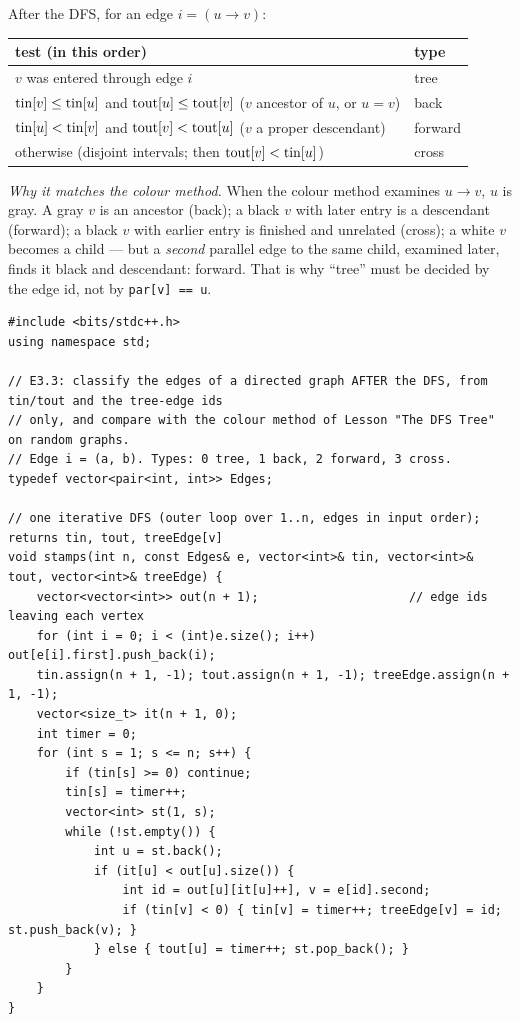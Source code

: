 \begin{solutionbox}
After the DFS, for an edge $i = (u \to v)$:
\begin{center}\small
\begin{tabular}{@{}ll@{}}
\toprule
\textbf{test (in this order)} & \textbf{type} \\
\midrule
$v$ was entered through edge $i$ & tree \\
$\mathrm{tin}[v] \le \mathrm{tin}[u]$ and $\mathrm{tout}[u] \le \mathrm{tout}[v]$ ($v$ ancestor of $u$, or $u = v$) & back \\
$\mathrm{tin}[u] < \mathrm{tin}[v]$ and $\mathrm{tout}[v] < \mathrm{tout}[u]$ ($v$ a proper descendant) & forward \\
otherwise (disjoint intervals; then $\mathrm{tout}[v] < \mathrm{tin}[u]$) & cross \\
\bottomrule
\end{tabular}
\end{center}
\emph{Why it matches the colour method.} When the colour method examines $u \to v$, $u$ is gray. A gray $v$ is an ancestor (back); a black $v$ with later entry is a descendant (forward); a black $v$ with earlier entry is finished and unrelated (cross); a white $v$ becomes a child --- but a \emph{second} parallel edge to the same child, examined later, finds it black and descendant: forward. That is why ``tree'' must be decided by the edge id, not by \texttt{par[v] == u}.
\begin{lstlisting}[style=cpp]
#include <bits/stdc++.h>
using namespace std;

// E3.3: classify the edges of a directed graph AFTER the DFS, from tin/tout and the tree-edge ids
// only, and compare with the colour method of Lesson "The DFS Tree" on random graphs.
// Edge i = (a, b). Types: 0 tree, 1 back, 2 forward, 3 cross.
typedef vector<pair<int, int>> Edges;

// one iterative DFS (outer loop over 1..n, edges in input order); returns tin, tout, treeEdge[v]
void stamps(int n, const Edges& e, vector<int>& tin, vector<int>& tout, vector<int>& treeEdge) {
    vector<vector<int>> out(n + 1);                     // edge ids leaving each vertex
    for (int i = 0; i < (int)e.size(); i++) out[e[i].first].push_back(i);
    tin.assign(n + 1, -1); tout.assign(n + 1, -1); treeEdge.assign(n + 1, -1);
    vector<size_t> it(n + 1, 0);
    int timer = 0;
    for (int s = 1; s <= n; s++) {
        if (tin[s] >= 0) continue;
        tin[s] = timer++;
        vector<int> st(1, s);
        while (!st.empty()) {
            int u = st.back();
            if (it[u] < out[u].size()) {
                int id = out[u][it[u]++], v = e[id].second;
                if (tin[v] < 0) { tin[v] = timer++; treeEdge[v] = id; st.push_back(v); }
            } else { tout[u] = timer++; st.pop_back(); }
        }
    }
}


\end{lstlisting}
\end{solutionbox}
